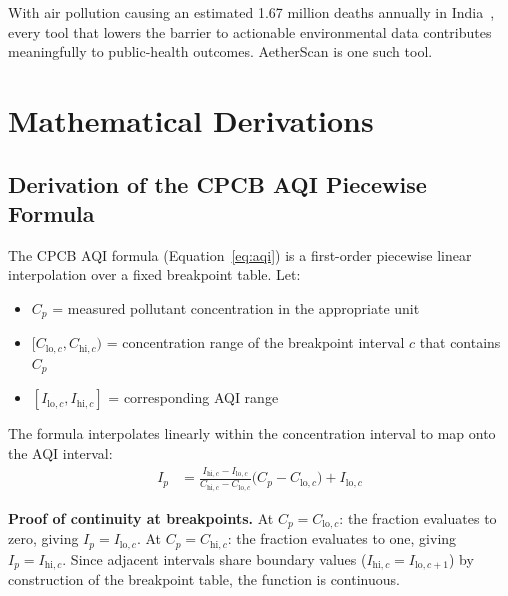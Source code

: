 \documentclass[12pt,a4paper]{article}
\begin{document}
With air pollution causing an estimated 1.67 million deaths annually in
India~\cite{who2021}, every tool that lowers the barrier to actionable
environmental data contributes meaningfully to public-health outcomes.
AetherScan is one such tool.

\clearpage

\appendix
\renewcommand{\thesection}{\Alph{section}}
\setcounter{section}{0}

\section{Mathematical Derivations}
\label{app:derivations}

\subsection{Derivation of the CPCB AQI Piecewise Formula}
\label{app:derive:aqi}

The CPCB AQI formula (Equation~\ref{eq:aqi}) is a first-order piecewise
linear interpolation over a fixed breakpoint table. Let:
\begin{itemize}[leftmargin=*]
\item $C_p$ = measured pollutant concentration in the appropriate unit
\item $[C_{\text{lo},c}, C_{\text{hi},c})$ = concentration range of the
  breakpoint interval $c$ that contains $C_p$
\item $[I_{\text{lo},c}, I_{\text{hi},c}]$ = corresponding AQI range
\end{itemize}

The formula interpolates linearly within the concentration interval to
map onto the AQI interval:
\begin{align}
I_p &= \frac{I_{\text{hi},c} - I_{\text{lo},c}}{C_{\text{hi},c} - C_{\text{lo},c}}
       \bigl(C_p - C_{\text{lo},c}\bigr) + I_{\text{lo},c}
\label{eq:aqideriv}
\end{align}

\noindent\textbf{Proof of continuity at breakpoints.}
At $C_p = C_{\text{lo},c}$: the fraction evaluates to zero, giving
$I_p = I_{\text{lo},c}$. At $C_p = C_{\text{hi},c}$: the fraction
evaluates to one, giving $I_p = I_{\text{hi},c}$. Since adjacent
intervals share boundary values ($I_{\text{hi},c} = I_{\text{lo},c+1}$)
by construction of the breakpoint table, the function is continuous.
\end{document}
